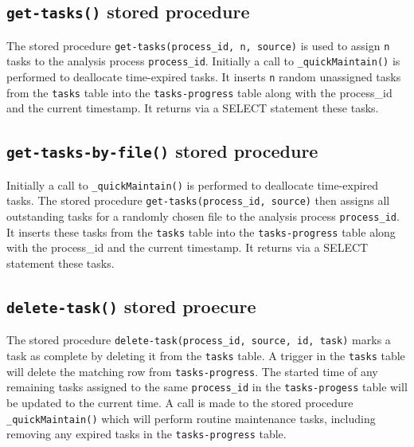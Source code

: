 \documentclass[
]{book}
\begin{document}
\hypertarget{get-tasks-stored-procedure}{%
\subsection{\texorpdfstring{\texttt{get-tasks()} stored procedure}{get-tasks() stored procedure}}\label{get-tasks-stored-procedure}}

The stored procedure \texttt{get-tasks(process\_id,\ n,\ source)} is used to assign \texttt{n} tasks to the analysis process \texttt{process\_id}. Initially a call to \texttt{\_quickMaintain()} is performed to deallocate time-expired tasks. It inserts \texttt{n} random unassigned tasks from the \texttt{tasks} table into the \texttt{tasks-progress} table along with the process\_id and the current timestamp. It returns via a SELECT statement these tasks.

\hypertarget{get-tasks-by-file-stored-procedure}{%
\subsection{\texorpdfstring{\texttt{get-tasks-by-file()} stored procedure}{get-tasks-by-file() stored procedure}}\label{get-tasks-by-file-stored-procedure}}

Initially a call to \texttt{\_quickMaintain()} is performed to deallocate time-expired tasks. The stored procedure \texttt{get-tasks(process\_id,\ source)} then assigns all outstanding tasks for a randomly chosen file to the analysis process \texttt{process\_id}. It inserts these tasks from the \texttt{tasks} table into the \texttt{tasks-progress} table along with the process\_id and the current timestamp. It returns via a SELECT statement these tasks.

\hypertarget{delete-task-stored-proecure}{%
\subsection{\texorpdfstring{\texttt{delete-task()} stored proecure}{delete-task() stored proecure}}\label{delete-task-stored-proecure}}

The stored procedure \texttt{delete-task(process\_id,\ source,\ id,\ task)} marks a task as complete by deleting it from the \texttt{tasks} table. A trigger in the \texttt{tasks} table will delete the matching row from \texttt{tasks-progress}. The started time of any remaining tasks assigned to the same \texttt{process\_id} in the \texttt{tasks-progess} table will be updated to the current time. A call is made to the stored procedure \texttt{\_quickMaintain()} which will perform routine maintenance tasks, including removing any expired tasks in the \texttt{tasks-progress} table.
\end{document}
